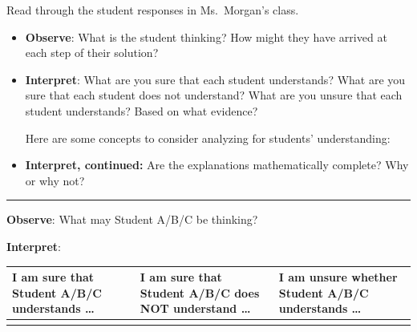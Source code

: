 \documentclass[11pt]{article}
\newenvironment{task}
	{\begin{mdframed}[linecolor=lightgray, linewidth=3pt]\raggedright}
	{\end{mdframed}}
\theoremstyle{definition}
\begin{document}
\begin{task}
Read through the student responses in Ms.~Morgan's class.

\begin{itemize}
\item {\bf Observe}: What is the student thinking? How might they have arrived at each step of their solution?
\item {\bf Interpret}: What are you sure that each student understands? What are you sure that each student
does not understand? What are you unsure that each student understands?  Based on what evidence?

Here are some concepts to consider analyzing for students' understanding:

	\vspace*{-2pt}
	
\item {\bf Interpret, continued:} Are the explanations mathematically complete? Why or why not?
	
\end{itemize}

\vspace*{2pt}
\hrule
\vspace*{2pt}

{\bf Observe}: What may Student A/B/C be thinking?

{\bf Interpret}: 

\begin{tabular}{C{1.75in}|C{1.75in}|C{1.75in}}
I am sure that Student A/B/C understands \dots  & I am sure that Student A/B/C
does NOT understand \dots & I am unsure whether
Student A/B/C understands \dots  \\ \hline
& & \\
\end{tabular}


\end{task}
\end{document}
